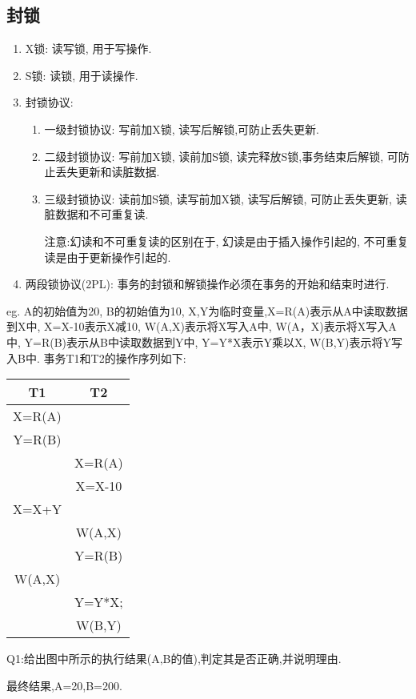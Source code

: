 \subsection{封锁}
\begin{enumerate}[label=(\arabic*)]
    \item X锁: 读写锁, 用于写操作.
    \item S锁: 读锁, 用于读操作.
    \item 封锁协议:
    \begin{enumerate}[label=\alph*.]
        \item 一级封锁协议: 写前加X锁, 读写后解锁,可防止丢失更新.
        \item 二级封锁协议: 写前加X锁, 读前加S锁, 读完释放S锁,事务结束后解锁, 可防止丢失更新和读脏数据.
        \item 三级封锁协议: 读前加S锁, 读写前加X锁, 读写后解锁, 可防止丢失更新, 读脏数据和不可重复读.
        \par 注意:幻读和不可重复读的区别在于, 幻读是由于插入操作引起的, 不可重复读是由于更新操作引起的.
    \end{enumerate}
    \item 两段锁协议(2PL): 事务的封锁和解锁操作必须在事务的开始和结束时进行.
\end{enumerate}
eg. A的初始值为20, B的初始值为10, X,Y为临时变量,X=R(A)表示从A中读取数据到X中, X=X-10表示X减10, W(A,X)表示将X写入A中,
W(A，X)表示将X写入A中, Y=R(B)表示从B中读取数据到Y中, Y=Y*X表示Y乘以X, W(B,Y)表示将Y写入B中.
事务T1和T2的操作序列如下:
\begin{table}[H] 
    \centering
    \begin{tabular}{cc} %
        \toprule %
        T1 & T2  \\
        \midrule %
        X=R(A) &  \\
        Y=R(B) & \\
        & X=R(A) \\
        & X=X-10 \\
        X=X+Y & \\
        & W(A,X) \\
        & Y=R(B) \\
        W(A,X) & \\
        & Y=Y*X;\\
        & W(B,Y) \\
        \bottomrule %
    \end{tabular}
\end{table}
Q1:给出图中所示的执行结果(A,B的值),判定其是否正确,并说明理由.
\par 最终结果,A=20,B=200.

